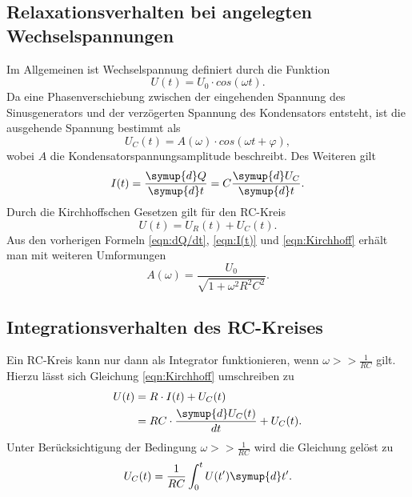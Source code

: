 \subsection{Relaxationsverhalten bei angelegten Wechselspannungen}
Im Allgemeinen ist Wechselspannung definiert durch die Funktion
\begin{equation*}
    U(t)=U_0 \cdot cos(\omega t).
\end{equation*}
Da eine Phasenverschiebung zwischen der eingehenden Spannung des Sinusgenerators und der verzögerten Spannung des Kondensators entsteht,
ist die ausgehende Spannung bestimmt als
\begin{equation*}
    U_{C}(t)=A(\omega)\cdot cos(\omega t +\varphi),
\end{equation*}
wobei $A$ die Kondensatorspannungsamplitude beschreibt.
Des Weiteren gilt
\begin{equation}
    \label{eqn:I(t)}
    I(t)=\frac{\symup{d}Q}{\symup{d}t}=C\frac{\symup{d}U_C}{\symup{d}t}.
\end{equation}
Durch die Kirchhoffschen Gesetzen gilt für den RC-Kreis
\begin{equation}
    \label{eqn:Kirchhoff}
    U(t)=U_{R}(t)+U_{C}(t).
\end{equation}
Aus den vorherigen Formeln \autoref{eqn:dQ/dt}, \autoref{eqn:I(t)} und \autoref{eqn:Kirchhoff} erhält man mit weiteren Umformungen
\begin{equation}
    \label{eqn:Amplitude}
    A(\omega)=\frac{U_0}{\sqrt{1+\omega^2 R^2 C^2}}.
\end{equation}


\subsection{Integrationsverhalten des RC-Kreises}
\label{subsec:int}
Ein RC-Kreis kann nur dann als Integrator funktionieren, wenn $\omega >> \frac{1}{RC}$ gilt.
Hierzu lässt sich Gleichung \autoref{eqn:Kirchhoff} umschreiben zu
\begin{align*}
    U(t)&=R \cdot I(t)+U_{C}(t)\\
        &=RC\cdot \frac{\symup{d}U_{C}(t)}{dt}+U_{C}(t).
\end{align*}
Unter Berücksichtigung der Bedingung $\omega >>\frac{1}{RC}$ wird die Gleichung gelöst zu
\begin{equation}
    \label{eqn:Kondensatorspannung}
    U_{C}(t)=\frac{1}{RC}\int_{0}^{t} U(t')\symup{d}t'.
\end{equation}